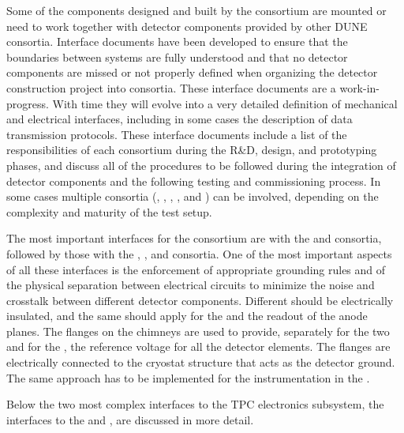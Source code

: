 Some of the components designed and built by the  consortium are
mounted or need to work together with detector components provided by other DUNE
consortia. Interface documents have been developed to ensure that the boundaries
between systems are fully understood and that no detector components are missed or
not properly defined when organizing the detector construction project into
consortia. These interface documents are a work-in-progress. With time they will
evolve into a very detailed definition of mechanical and electrical interfaces,
including in some cases the description of data transmission protocols. These
interface documents include a list of the responsibilities of each consortium during the
R\&D, design, and prototyping phases, and discuss all of the procedures to be
followed during the integration of detector components and the following testing
and commissioning process. In some cases multiple consortia (, , , ,
and ) %
can be involved, depending on the complexity and maturity of the test setup.

The most important interfaces for the  consortium are with the  and 
consortia, followed by those with the , , and  consortia. One of the most
important aspects of all these interfaces is the enforcement of appropriate grounding rules
and of the physical separation between electrical circuits to minimize the noise and
crosstalk between different detector components. Different  should be electrically
insulated, and the same should apply for the  and the
 readout of the anode planes. The flanges on the chimneys are used to provide,
separately for the two  and for the , the reference
voltage for all the detector elements. The flanges are electrically connected
to the cryostat structure that acts as the detector ground. The same approach
has to be implemented for the  instrumentation in the \lar.

Below the two most complex interfaces to the TPC electronics subsystem, the
interfaces to the  and , are discussed in more detail.

